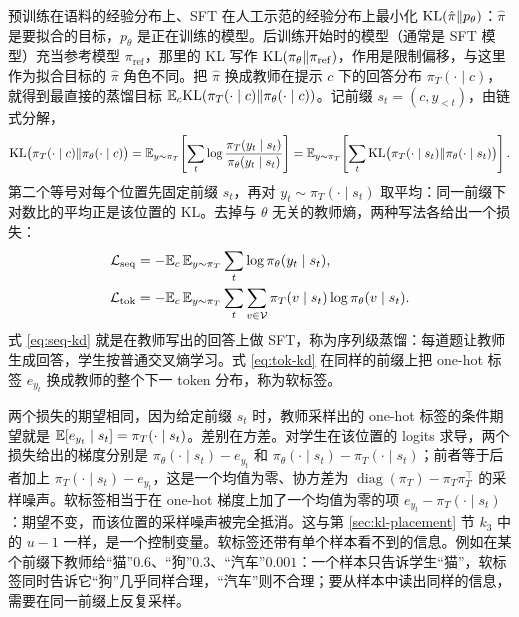 预训练在语料的经验分布上、SFT 在人工示范的经验分布上最小化 \(\mathrm{KL}(\hat\pi\Vert p_\theta)\)：\(\hat\pi\) 是要拟合的目标，\(p_\theta\) 是正在训练的模型。后训练开始时的模型（通常是 SFT 模型）充当参考模型 \(\pi_{\mathrm{ref}}\)，那里的 KL 写作 \(\mathrm{KL}(\pi_\theta\Vert\pi_{\mathrm{ref}})\)，作用是限制偏移，与这里作为拟合目标的 \(\hat\pi\) 角色不同。把 \(\hat\pi\) 换成教师在提示 \(c\) 下的回答分布 \(\pi_T(\cdot\mid c)\)，就得到最直接的蒸馏目标 \(\mathbb{E}_c\mathrm{KL}(\pi_T(\cdot\mid c)\Vert\pi_\theta(\cdot\mid c))\)。记前缀 \(s_t=(c,y_{<t})\)，由链式分解，
\begin{equation}
 \mathrm{KL}\bigl(\pi_T(\cdot\mid c)\Vert\pi_\theta(\cdot\mid c)\bigr)
 =\mathbb{E}_{y\sim\pi_T}\!\left[\sum_{t}\log\frac{\pi_T(y_t\mid s_t)}{\pi_\theta(y_t\mid s_t)}\right]
 =\mathbb{E}_{y\sim\pi_T}\!\left[\sum_{t}\mathrm{KL}\bigl(\pi_T(\cdot\mid s_t)\Vert\pi_\theta(\cdot\mid s_t)\bigr)\right].
 \label{eq:forward-kd-chain}
\end{equation}
第二个等号对每个位置先固定前缀 \(s_t\)，再对 \(y_t\sim\pi_T(\cdot\mid s_t)\) 取平均：同一前缀下对数比的平均正是该位置的 KL。去掉与 \(\theta\) 无关的教师熵，两种写法各给出一个损失：
\begin{align}
 \mathcal L_{\mathrm{seq}}&=-\mathbb{E}_c\,\mathbb{E}_{y\sim\pi_T}\sum_t\log\pi_\theta(y_t\mid s_t),\label{eq:seq-kd}\\
 \mathcal L_{\mathrm{tok}}&=-\mathbb{E}_c\,\mathbb{E}_{y\sim\pi_T}\sum_t\sum_{v\in\mathcal V}\pi_T(v\mid s_t)\log\pi_\theta(v\mid s_t).\label{eq:tok-kd}
\end{align}
式 \eqref{eq:seq-kd} 就是在教师写出的回答上做 SFT，称为序列级蒸馏：每道题让教师生成回答，学生按普通交叉熵学习。式 \eqref{eq:tok-kd} 在同样的前缀上把 one-hot 标签 \(e_{y_t}\) 换成教师的整个下一 token 分布，称为软标签。

两个损失的期望相同，因为给定前缀 \(s_t\) 时，教师采样出的 one-hot 标签的条件期望就是 \(\mathbb{E}[e_{y_t}\mid s_t]=\pi_T(\cdot\mid s_t)\)。差别在方差。对学生在该位置的 logits 求导，两个损失给出的梯度分别是 \(\pi_\theta(\cdot\mid s_t)-e_{y_t}\) 和 \(\pi_\theta(\cdot\mid s_t)-\pi_T(\cdot\mid s_t)\)；前者等于后者加上 \(\pi_T(\cdot\mid s_t)-e_{y_t}\)，这是一个均值为零、协方差为 \(\operatorname{diag}(\pi_T)-\pi_T\pi_T^\top\) 的采样噪声。软标签相当于在 one-hot 梯度上加了一个均值为零的项 \(e_{y_t}-\pi_T(\cdot\mid s_t)\)：期望不变，而该位置的采样噪声被完全抵消。这与第 \ref{sec:kl-placement} 节 \(k_3\) 中的 \(u-1\) 一样，是一个控制变量。软标签还带有单个样本看不到的信息。例如在某个前缀下教师给“猫”\(0.6\)、“狗”\(0.3\)、“汽车”\(0.001\)：一个样本只告诉学生“猫”，软标签同时告诉它“狗”几乎同样合理，“汽车”则不合理；要从样本中读出同样的信息，需要在同一前缀上反复采样。

